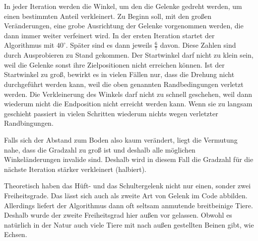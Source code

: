 In jeder Iteration werden die Winkel, um den die Gelenke gedreht werden, um einen bestimmten Anteil verkleinert. Zu Beginn soll, mit den großen Veränderungen, eine grobe Ausrichtung der Gelenke vorgenommen werden, die dann immer weiter verfeinert wird.
In der ersten Iteration startet der Algorithmus mit $40^{\circ}$. Später sind es dann jeweils $\frac{6}{7}$ davon.
Diese Zahlen sind durch Ausprobieren zu Stand gekommen. Der Startwinkel darf nicht zu klein sein, weil die Gelenke sonst ihre Zielpositionen nicht erreichen können. Ist der Startwinkel zu groß, bewirkt es in vielen Fällen nur, dass die Drehung nicht durchgeführt werden kann, weil die oben genannten Randbedingungen verletzt werden.
Die Verkleinerung des Winkels darf nicht zu schnell geschehen, weil dann wiederum nicht die Endposition nicht erreicht werden kann. Wenn sie zu langsam geschieht passiert in vielen Schritten wiederum nichts wegen verletzter Randbingungen.

Falls sich der Abstand zum Boden also kaum verändert, liegt die Vermutung nahe, dass die Gradzahl zu groß ist und deshalb alle möglichen Winkeländerungen invalide sind. Deshalb wird in diesem Fall die Gradzahl für die nächste Iteration stärker verkleinert (halbiert).


Theoretisch haben das Hüft- und das Schultergelenk nicht nur einen, sonder zwei Freiheitsgrade. Das lässt sich auch als zweite Art von Gelenk im Code abbilden. Allerdings liefert der Algorithmus dann oft seltsam anmutende breitbeinige Tiere.
Deshalb wurde der zweite Freiheitsgrad hier außen vor gelassen.
Obwohl es natürlich in der Natur auch viele Tiere mit nach außen gestellten Beinen gibt, wie \zb Echsen.


%  
% 

